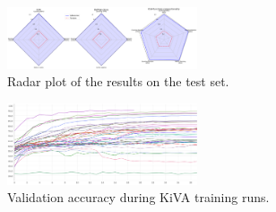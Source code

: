 \documentclass[twocolumn]{article} %
\begin{document}
\begin{figure}[h]\vspace{-0.5\baselineskip}
    \centering
    \includegraphics[width=0.5\textwidth]{figures/combined_radar.png}
    \caption{Radar plot of the results on the test set.}
    \label{fig:radar_plot}
\end{figure}\vspace{-0.5\baselineskip}

\begin{figure}[h]\vspace{-0.5\baselineskip}
    \centering
    \includegraphics[width=0.5\textwidth]{figures/train_runs.png}
    \caption{Validation accuracy during KiVA training runs.}
    \label{fig:train_runs}
\end{figure}\vspace{-0.5\baselineskip}


\normalsize

\end{document}
